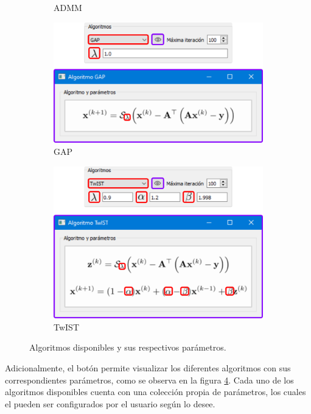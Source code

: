 \documentclass[12pt,oneside,letter]{ol-softwaremanual}
\begin{document}
\begin{figure}[!ht]
\begin{subfigure}[b]{0.45\textwidth}
         \caption{ADMM}
         \label{fig:admm}
     \end{subfigure}
     \begin{subfigure}[b]{0.45\textwidth}
         \centering
         \includegraphics[width=\textwidth]{algorithm-gap.png}
         \caption{GAP}
         \label{fig:gap}
     \end{subfigure}
     \hfill
     \begin{subfigure}[b]{0.45\textwidth}
         \centering
         \includegraphics[width=\textwidth]{algorithm-twist.png}
         \caption{TwIST}
         \label{fig:twist}
     \end{subfigure}
        \caption{Algoritmos disponibles y sus respectivos parámetros.}
        \label{fig:algorithms}
\end{figure}

Adicionalmente, el botón\hspace{0.5mm} \faEye \hspace{0.5mm} permite visualizar los diferentes algoritmos con sus correspondientes parámetros, como se observa en la figura \ref{fig:algorithms}. Cada uno de los algoritmos disponibles cuenta con una colección propia de parámetros, los cuales el pueden ser configurados por el usuario según lo desee.
\end{document}
